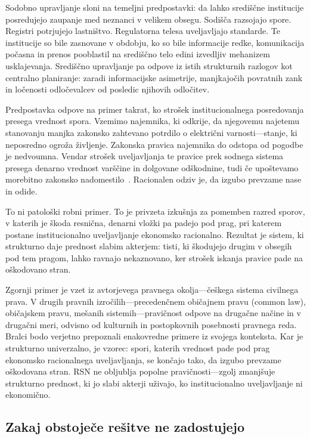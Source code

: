 \documentclass[11pt,a4paper,twocolumn]{article}
\begin{document}
Sodobno upravljanje sloni na temeljni predpostavki: da lahko središčne institucije posredujejo zaupanje med neznanci v velikem obsegu. Sodišča razsojajo spore. Registri potrjujejo lastništvo. Regulatorna telesa uveljavljajo standarde. Te institucije so bile zasnovane v obdobju, ko so bile informacije redke, komunikacija počasna in prenos pooblastil na središčno telo edini izvedljiv mehanizem usklajevanja. Središčno upravljanje pa odpove iz istih strukturnih razlogov kot centralno planiranje: zaradi informacijske asimetrije, manjkajočih povratnih zank in ločenosti odločevalcev od posledic njihovih odločitev.

Predpostavka odpove na primer takrat, ko strošek institucionalnega posredovanja presega vrednost spora. Vzemimo najemnika, ki odkrije, da njegovemu najetemu stanovanju manjka zakonsko zahtevano potrdilo o električni varnosti---stanje, ki neposredno ogroža življenje. Zakonska pravica najemnika do odstopa od pogodbe je nedvoumna. Vendar strošek uveljavljanja te pravice prek sodnega sistema presega denarno vrednost varščine in dolgovane odškodnine, tudi če upoštevamo morebitno zakonsko nadomestilo~\cite{czcourtfees}. Racionalen odziv je, da izgubo prevzame nase in odide.

To ni patološki robni primer. To je privzeta izkušnja za pomemben razred sporov, v katerih je škoda resnična, denarni vložki pa padejo pod prag, pri katerem postane institucionalno uveljavljanje ekonomsko racionalno. Rezultat je sistem, ki strukturno daje prednost slabim akterjem: tisti, ki škodujejo drugim v obsegih pod tem pragom, lahko ravnajo nekaznovano, ker strošek iskanja pravice pade na oškodovano stran.

Zgornji primer je vzet iz avtorjevega pravnega okolja---češkega sistema civilnega prava. V drugih pravnih izročilih---precedenčnem običajnem pravu (common law), običajskem pravu, mešanih sistemih---pravičnost odpove na drugačne načine in v drugačni meri, odvisno od kulturnih in postopkovnih posebnosti pravnega reda. Bralci bodo verjetno prepoznali enakovredne primere iz svojega konteksta. Kar je strukturno univerzalno, je vzorec: spori, katerih vrednost pade pod prag ekonomsko racionalnega uveljavljanja, se končajo tako, da izgubo prevzame oškodovana stran. RSN ne obljublja popolne pravičnosti---zgolj zmanjšuje strukturno prednost, ki jo slabi akterji uživajo, ko institucionalno uveljavljanje ni ekonomično.

\subsection{Zakaj obstoječe rešitve ne zadostujejo}
\end{document}
